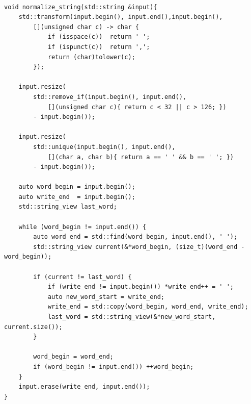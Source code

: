 \documentclass{article}
\begin{document}
\begin{lstlisting}[caption={Funkcja \texttt{normalize\_string} w wersji 4}]

void normalize_string(std::string &input){
    std::transform(input.begin(), input.end(),input.begin(),
        [](unsigned char c) -> char {
            if (isspace(c))  return ' ';
            if (ispunct(c))  return ',';
            return (char)tolower(c);
        });
    
    input.resize(
        std::remove_if(input.begin(), input.end(),
            [](unsigned char c){ return c < 32 || c > 126; })
        - input.begin());

    input.resize(
        std::unique(input.begin(), input.end(),
            [](char a, char b){ return a == ' ' && b == ' '; })
        - input.begin());

    auto word_begin = input.begin();
    auto write_end  = input.begin();
    std::string_view last_word;

    while (word_begin != input.end()) {
        auto word_end = std::find(word_begin, input.end(), ' ');
        std::string_view current(&*word_begin, (size_t)(word_end - word_begin));

        if (current != last_word) {
            if (write_end != input.begin()) *write_end++ = ' ';
            auto new_word_start = write_end;
            write_end = std::copy(word_begin, word_end, write_end);
            last_word = std::string_view(&*new_word_start, current.size());
        }

        word_begin = word_end;
        if (word_begin != input.end()) ++word_begin;
    }
    input.erase(write_end, input.end());
}
\end{lstlisting}
\end{document}
